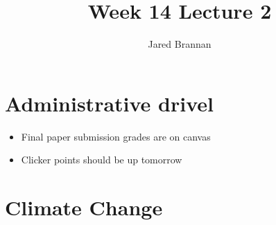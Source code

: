 \documentclass{article}
\title{Week 14 Lecture 2}
\author{Jared Brannan }
\theoremstyle{definition}
\begin{document}
\maketitle

\section{Administrative drivel}
\begin{itemize}
	\item Final paper submission grades are on canvas
	\item Clicker points should be up tomorrow
\end{itemize}

\section{Climate Change}
\end{document}
